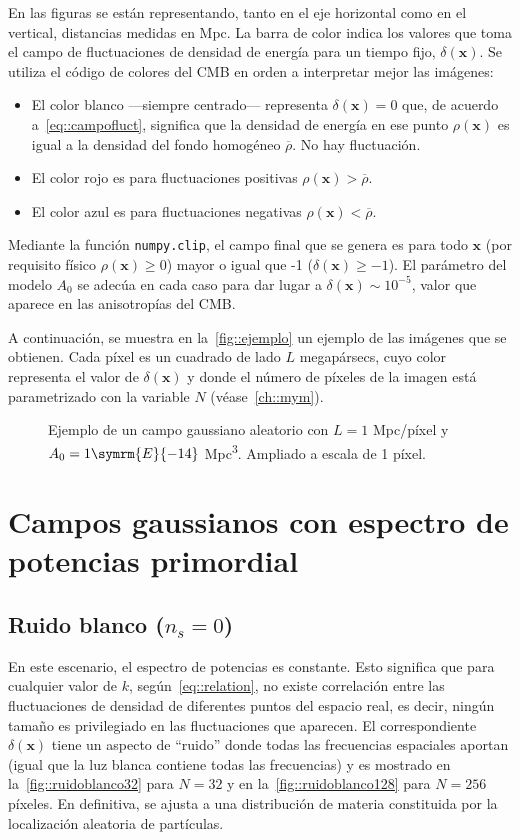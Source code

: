 En las figuras se están representando, tanto en el eje horizontal como en el vertical, distancias medidas en Mpc. La barra de color indica los valores que toma el campo de fluctuaciones de densidad de energía para un tiempo fijo, \(\delta(\symbf{x})\). Se utiliza el código de colores del CMB en orden a interpretar mejor las imágenes:
\begin{itemize}
    \item El color blanco ---siempre centrado--- representa \(\delta(\symbf{x})=0\) que, de acuerdo a~\eqref{eq::campofluct}, significa que la densidad de energía en ese punto \(\rho(\symbf{x})\) es igual a la densidad del fondo homogéneo \(\overbar{\rho}\). No hay fluctuación.
    \item El color rojo es para fluctuaciones positivas \(\rho(\symbf{x})>\overbar{\rho}\).
    \item El color azul es para fluctuaciones negativas \(\rho(\symbf{x})<\overbar{\rho}\).
\end{itemize}
Mediante la función \texttt{numpy.clip}, el campo final que se genera es para todo \(\symbf{x}\) (por requisito físico \(\rho(\symbf{x})\geq 0\)) mayor o igual que -1 (\(\delta(\symbf{x})\geq -1\)). El parámetro del modelo \(A_0\) se adecúa en cada caso para dar lugar a \(\delta(\symbf{x})\sim 10^{-5}\), valor que aparece en las anisotropías del CMB.

A continuación, se muestra en la~\autoref{fig::ejemplo} un ejemplo de las imágenes que se obtienen. Cada píxel es un cuadrado de lado \(L\) megapársecs, cuyo color representa el valor de \(\delta(\symbf{x})\) y donde el número de píxeles de la imagen está parametrizado con la variable \(N\) (véase~\autoref{ch::mym}).
\begin{figure}[h!]
    \centering
    \scalebox{.99}{}
    \caption[Ejemplo de un campo gaussiano aleatorio]{Ejemplo de un campo gaussiano aleatorio con \(L=1\) Mpc/píxel y \(A_0=1\symrm{E}{-14}\) Mpc\textsuperscript{3}. Ampliado a escala de 1 píxel.}
    \label{fig::ejemplo}
\end{figure}
\section{Campos gaussianos con espectro de potencias primordial}
\subsection{Ruido blanco (\texorpdfstring{\(n_s=0\)}{ns=0})}
En este escenario, el espectro de potencias es constante. Esto significa que para cualquier valor de \(k\), según~\eqref{eq::relation}, no existe correlación entre las fluctuaciones de densidad de diferentes puntos del espacio real, es decir, ningún tamaño es privilegiado en las fluctuaciones que aparecen. El correspondiente \(\delta(\symbf{x})\) tiene un aspecto de ``ruido'' donde todas las frecuencias espaciales aportan (igual que la luz blanca contiene todas las frecuencias) y es mostrado en la~\autoref{fig::ruidoblanco32} para \(N=32\) y en la~\autoref{fig::ruidoblanco128} para \(N=256\) píxeles. En definitiva, se ajusta a una distribución de materia constituida por la localización aleatoria de partículas.

